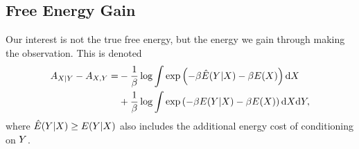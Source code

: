 \documentclass[]{article}
\begin{document}
\subsection{Free Energy Gain}

Our interest is not the true free energy, but the energy we gain through
making the observation. This is denoted 
\begin{align*}
A_{X|Y} - A_{X,Y} = & -\frac{1}{\beta} \log \int \exp\left(-\beta \hat{E}(Y|X) -\beta E(X)\right) \text{d}X \\
& +\frac{1}{\beta} \log \int \exp\left(-\beta E(Y|X) -\beta E(X)\right) \text{d}X\text{d}Y,
\end{align*}
where
\(\hat{E}(Y|X)\geq E(Y|X)\)
also includes the additional energy cost of conditioning on
\(Y\).
\end{document}
